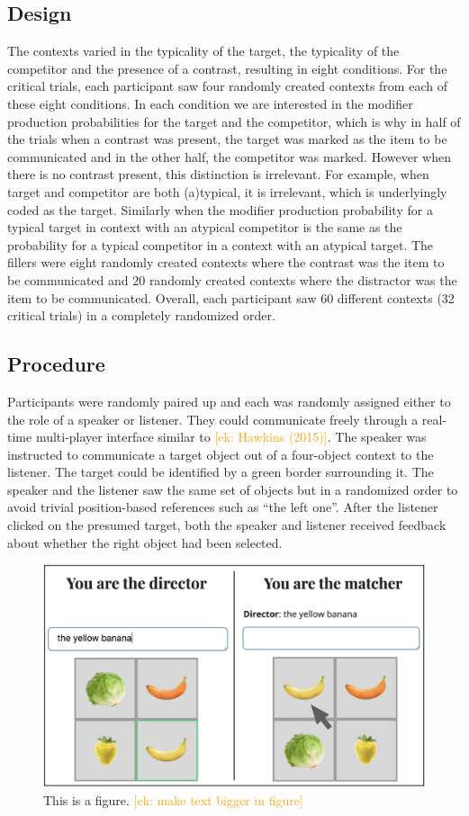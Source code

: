 \documentclass[10pt,letterpaper]{article}
\newcommand{\ek}[1]{\textcolor{Orange}{[ek: #1]}}
\begin{document}
\subsection{Design}
The contexts varied in the typicality of the target, the typicality of the competitor and the presence of a contrast, resulting in eight conditions. For the critical trials, each participant saw four randomly created contexts from each of these eight conditions. In each condition we are interested in the modifier production probabilities for the target and the competitor, which is why in half of the trials when a contrast was present, the target was marked as the item to be communicated and in the other half, the competitor was marked. However when there is no contrast present, this distinction is irrelevant. For example, when target and competitor are both (a)typical, it is irrelevant, which is underlyingly coded as the target. Similarly when the modifier production probability for a typical target in context with an atypical competitor is the same as the probability for a typical competitor in a context with an atypical target. 
The fillers were eight randomly created contexts where the contrast was the item to be communicated and 20 randomly created contexts where the distractor was the item to be communicated.
Overall, each participant saw 60 different contexts (32 critical trials) in a completely randomized order.


\subsection{Procedure}
Participants were randomly paired up and each was randomly assigned either to the role of a speaker or listener. They could communicate freely through a real-time multi-player interface similar to \ek{Hawkins (2015)}. The speaker was instructed to communicate a target object out of a four-object context to the listener. The target could be identified by a green border surrounding it. The speaker and the listener saw the same set of objects but in a randomized order to avoid trivial position-based references such as ``the left one''. After the listener clicked on the presumed target, both the speaker and listener received feedback about whether the right object had been selected.

\begin{figure}
	\begin{center}
		\includegraphics[width=.475\textwidth]{graphs/prod-design.pdf}
	\end{center}
\caption{This is a figure. \ek{make text bigger in figure}} 
\label{prod-results}
\end{figure}
\end{document}
